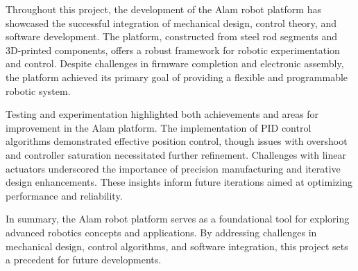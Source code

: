 Throughout this project, the development of the Alam robot platform has showcased the successful integration of mechanical design, control theory, and software development. The platform, constructed from steel rod segments and 3D-printed components, offers a robust framework for robotic experimentation and control. Despite challenges in firmware completion and electronic assembly, the platform achieved its primary goal of providing a flexible and programmable robotic system.

Testing and experimentation highlighted both achievements and areas for improvement in the Alam platform. The implementation of PID control algorithms demonstrated effective position control, though issues with overshoot and controller saturation necessitated further refinement. Challenges with linear actuators underscored the importance of precision manufacturing and iterative design enhancements. These insights inform future iterations aimed at optimizing performance and reliability.

In summary, the Alam robot platform serves as a foundational tool for exploring advanced robotics concepts and applications. By addressing challenges in mechanical design, control algorithms, and software integration, this project sets a precedent for future developments. 